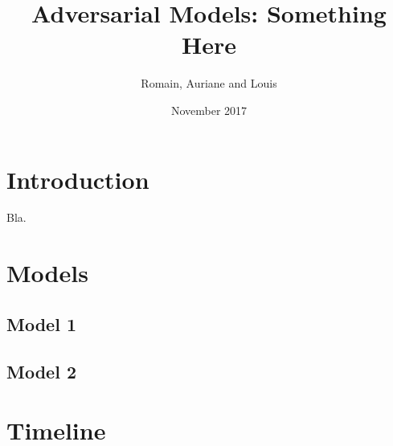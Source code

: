 \documentclass{article}
\title{Adversarial Models: Something Here}
\author{Romain, Auriane and Louis}
\date{November 2017}
\begin{document}
\maketitle

\section{Introduction}
Bla.
\section{Models}
\subsection{Model 1}
\subsection{Model 2}
\section{Timeline}
\end{document}
